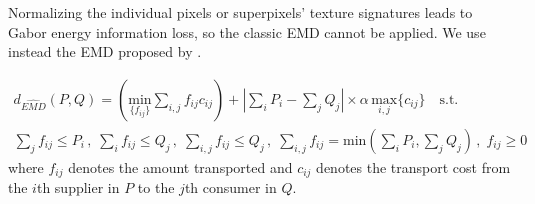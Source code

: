 Normalizing the individual pixels or superpixels' texture signatures leads to Gabor energy information loss, so the classic EMD cannot be applied. We use instead the EMD proposed by \citep{Pele.Werman::2008}.

\begin{eqnarray}
d_{\widehat{EMD}}(P, Q) = \left( \underset{\{f_{ij}\}}{\mathrm{min}}\sum_{i,j}f_{ij}c_{ij}\right)
+ \left\vert \sum_{i} P_i - \sum_{j} Q_j \right\vert \times \alpha\, \underset{{i,j}}{\mathrm{max}} \{c_{ij}\}  \quad \text{s.t.}\nonumber \label{eq:emd_pele} \\
\sum_{j}f_{ij} \leq P_i \, , \; \sum_{i}f_{ij} \leq Q_j \, , \; \sum_{i,j}f_{ij} \leq Q_j \, , \; \sum_{i,j}f_{ij} = \mathrm{min} \left( \sum_{i} P_i , \sum_{j} Q_j\right)\, , \; f_{ij} \geq 0
\end{eqnarray}
where $f_{ij}$ denotes the amount transported and $c_{ij}$ denotes the transport cost from the $i$th supplier in $P$ to the $j$th consumer in $Q$. 


